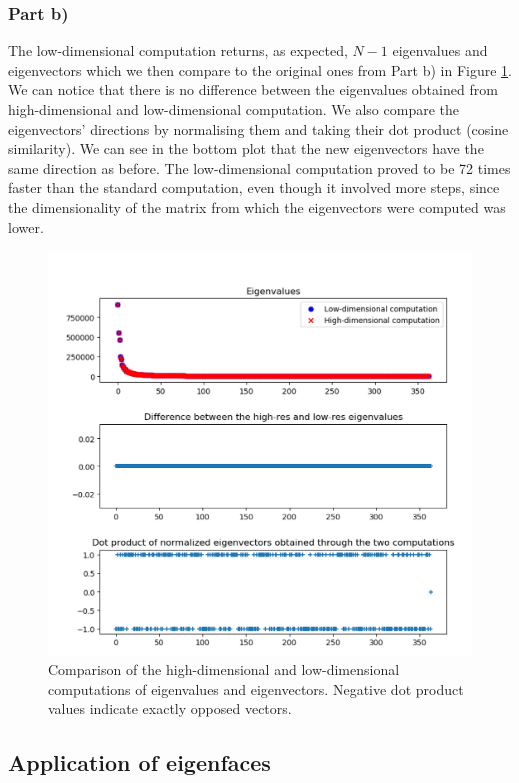 \documentclass[10pt,technote]{IEEEtran}
\begin{document}
\subsubsection{Part b)}
The low-dimensional computation returns, as expected, $N - 1$ eigenvalues and eigenvectors which we then compare to the original ones from Part b) in Figure \ref{fig:eig_diff1}. We can notice that there is no difference between the eigenvalues obtained from high-dimensional and low-dimensional computation. We also compare the eigenvectors' directions by normalising them and taking their dot product (cosine similarity). We can see in the bottom plot that the new eigenvectors have the same direction as before. 
The low-dimensional computation proved to be 72 times faster than the standard computation, even though it involved more steps, since the dimensionality of the matrix from which the eigenvectors were computed was lower.
\begin{figure}[htb!]
    \centering
    \includegraphics[width=\linewidth]{../results/ex1b/DIfference_eig.png}
    \caption{Comparison of the high-dimensional and low-dimensional computations of eigenvalues and eigenvectors. Negative dot product values indicate exactly opposed vectors.}
    \label{fig:eig_diff1}
\end{figure}

\subsection{Application of eigenfaces}
\end{document}
